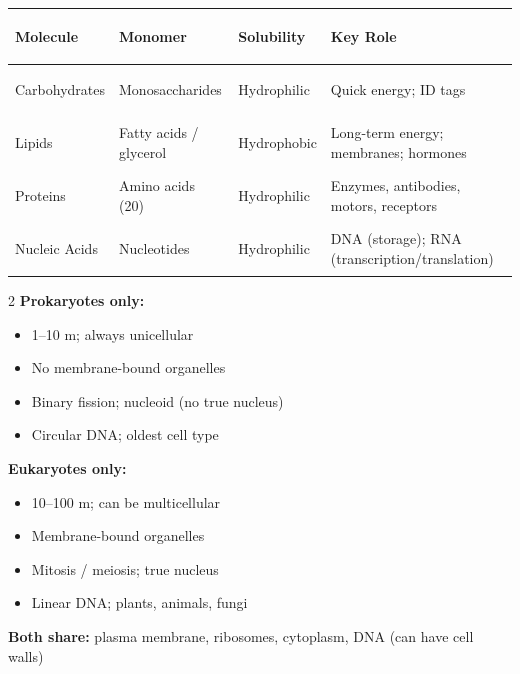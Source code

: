 \documentclass[11pt, letterpaper]{article}
\begin{document}
\vspace{4pt}

\begin{tcolorbox}[colback=part2bg, colframe=sectiongreen,
  title={\bfseries Macromolecules}, arc=3pt, boxrule=1pt]
\footnotesize\renewcommand{\arraystretch}{1.3}
\begin{tabularx}{\linewidth}{>{\bfseries\raggedright\arraybackslash}X >{\raggedright\arraybackslash}X >{\raggedright\arraybackslash}X >{\raggedright\arraybackslash}X}
\toprule
Molecule & Monomer & Solubility & Key Role \\
\midrule
Carbohydrates & Monosaccharides & Hydrophilic & Quick energy; ID tags \\
Lipids        & Fatty acids / glycerol & Hydrophobic & Long-term energy; membranes; hormones \\
Proteins      & Amino acids (20) & Hydrophilic & Enzymes, antibodies, motors, receptors \\
Nucleic Acids & Nucleotides & Hydrophilic & DNA (storage); RNA (transcription/translation) \\
\bottomrule
\end{tabularx}
\end{tcolorbox}

\vspace{4pt}

\begin{tcolorbox}[colback=partbg, colframe=sectionblue,
  title={\bfseries Prokaryotes vs.\ Eukaryotes}, arc=3pt, boxrule=1pt]
\begin{multicols}{2}
\textbf{Prokaryotes only:}
\begin{itemize}[noitemsep, leftmargin=*]
  \item 1--10 \textmu m; always unicellular
  \item No membrane-bound organelles
  \item Binary fission; nucleoid (no true nucleus)
  \item Circular DNA; oldest cell type
\end{itemize}
\columnbreak
\textbf{Eukaryotes only:}
\begin{itemize}[noitemsep, leftmargin=*]
  \item 10--100 \textmu m; can be multicellular
  \item Membrane-bound organelles
  \item Mitosis / meiosis; true nucleus
  \item Linear DNA; plants, animals, fungi
\end{itemize}
\end{multicols}
\textbf{Both share:} plasma membrane, ribosomes, cytoplasm, DNA (can have cell walls)
\end{tcolorbox}
\end{document}

